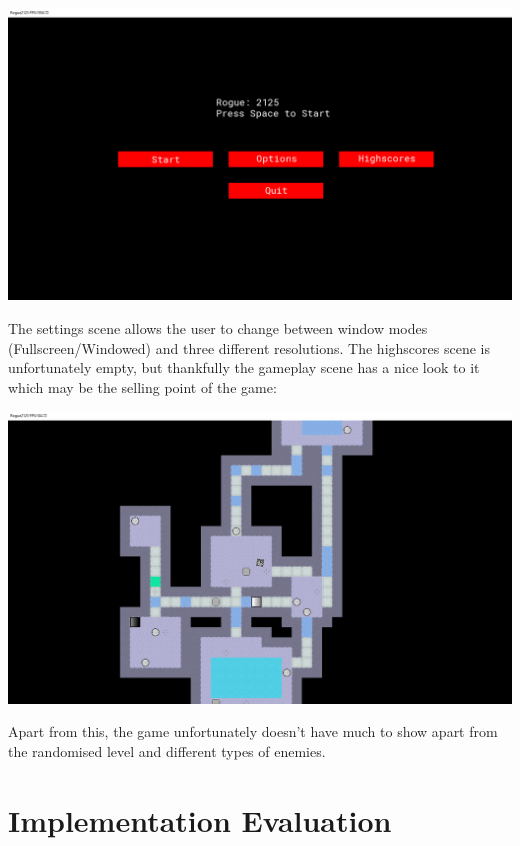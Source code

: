\documentclass[12pt]{article}
\begin{document}
\includegraphics[width=\textwidth,height=\textheight,keepaspectratio]{MainMenu}

\hspace{1cm}

The settings scene allows the user to change between window modes (Fullscreen/Windowed) and three different resolutions. The highscores scene is unfortunately empty, but thankfully the gameplay scene has a nice look to it which may be the selling point of the game:

\includegraphics[width=\textwidth,height=\textheight,keepaspectratio]{Gameplay}

\hspace{1cm}

Apart from this, the game unfortunately doesn't have much to show apart from the randomised level and different types of enemies.

\clearpage

\section{Implementation Evaluation}
\end{document}

